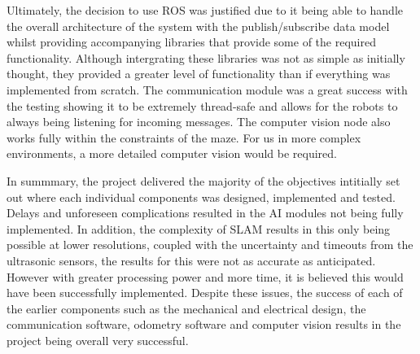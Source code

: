 Ultimately, the decision to use ROS was justified due to it being able to handle
the overall architecture of the system with the publish/subscribe data model
whilst providing accompanying libraries that provide some of the required 
functionality. Although intergrating these libraries was not as simple as 
initially thought, they provided a greater level of functionality than if 
everything was implemented from scratch. The communication module was a great
success with the testing showing it to be extremely thread-safe and allows for
the robots to always being listening for incoming messages. The computer vision
node also works fully within the constraints of the maze. For us in more complex 
environments, a more detailed computer vision would be required.

In summmary, the project delivered the majority of the objectives intitially set
out where each individual components was designed, implemented and tested. Delays
and unforeseen complications resulted in the AI modules not being fully implemented. 
In addition, the complexity of SLAM results in this only being possible at lower 
resolutions, coupled with the uncertainty and timeouts from the ultrasonic sensors, 
the results for this were not as accurate as anticipated. However with greater 
processing power and more time, it is believed this would have been successfully 
implemented. Despite these issues, the success of each of the earlier components
such as the mechanical and electrical design, the communication software, odometry 
software and computer vision results in the project being overall very successful.